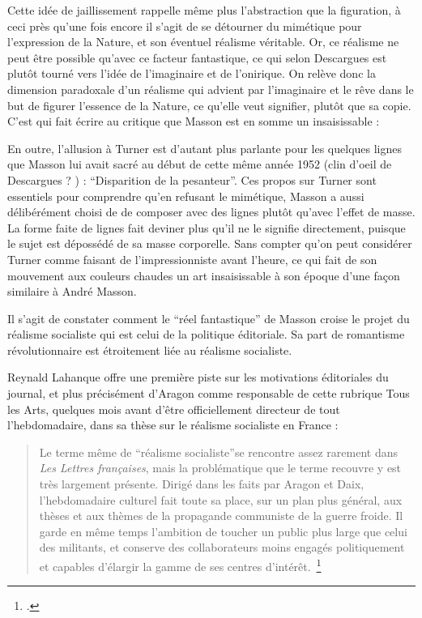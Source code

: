 	  Cette idée de jaillissement rappelle même plus l’abstraction que la figuration, à ceci près qu’une fois encore il s’agit de se détourner du mimétique pour l’expression de la Nature, et son éventuel réalisme véritable. Or, ce réalisme ne peut être possible qu’avec ce facteur fantastique, ce qui selon Descargues est plutôt tourné vers l’idée de l’imaginaire et de l’onirique. On relève donc la dimension paradoxale d’un réalisme qui advient par l’imaginaire et le rêve dans le but de figurer l’essence de la Nature, ce qu’elle veut signifier, plutôt que sa copie. C’est qui fait écrire au critique que Masson est en somme un insaisissable : 
 
En outre, l’allusion à Turner est d’autant plus parlante pour les quelques lignes que Masson lui avait sacré au début de cette même année 1952 (clin d’oeil de Descargues ? ) : \enquote{Disparition de la pesanteur}. Ces propos sur Turner sont essentiels pour comprendre qu’en refusant le mimétique, Masson a aussi délibérément choisi de de composer avec des lignes plutôt qu’avec l’effet de masse. La forme faite de lignes fait deviner plus qu’il ne le signifie directement, puisque le sujet est dépossédé de sa masse corporelle. Sans compter qu’on peut considérer Turner comme faisant de l’impressionniste avant l’heure, ce qui fait de son mouvement aux couleurs chaudes un art insaisissable à son époque d’une façon similaire à André Masson. 

Il  s’agit de constater comment le \enquote{réel fantastique} de Masson  croise le projet du réalisme socialiste qui est celui de la politique éditoriale. Sa part de romantisme révolutionnaire est étroitement liée au réalisme socialiste. 


	Reynald Lahanque offre une première piste sur les motivations éditoriales du journal, et plus précisément d’Aragon comme responsable de cette rubrique Tous les Arts, quelques mois avant d’être officiellement directeur de tout l’hebdomadaire, dans sa thèse sur le réalisme socialiste en France : 

\begin{quote}
Le terme même de \enquote{réalisme socialiste}se rencontre assez rarement dans \emph{Les Lettres françaises}, mais la problématique que le terme recouvre y est très largement présente. Dirigé dans les faits par Aragon et Daix, l'hebdomadaire culturel fait toute sa place, sur un plan plus général, aux thèses et aux thèmes de la propagande communiste de la guerre froide. Il garde en même temps l'ambition de toucher un public plus large que celui des militants, et conserve des collaborateurs moins engagés politiquement et capables d'élargir la gamme de ses centres d’intérêt. \footcite{}\end{quote}

